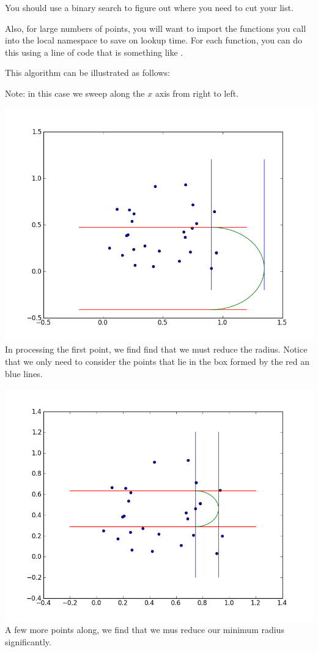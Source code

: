 
You should use a binary search to figure out where you need to cut your list. 

Also, for large numbers of points, you will want to import the functions you call into the local namespace to save on lookup time. 
For each function, you can do this using a line of code that is something like . 

This algorithm can be illustrated as follows:

Note: in this case we sweep along the $x$ axis from right to left.

\includegraphics[width = \textwidth]{ptsweep1.png}
In processing the first point, we find find that we must reduce the radius. Notice that we only need to consider the points that lie in the box formed by the red an blue lines.


\includegraphics[width = \textwidth]{ptsweep4.png}
A few more points along, we find that we mus reduce our minimum radius significantly.


